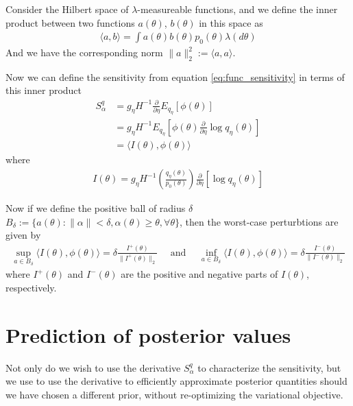 \documentclass[a4paper]{article}
\begin{document}
Consider the Hilbert space of $\lambda$-measureable functions, and we
define the inner product between two functions $a(\theta)$,
$b(\theta)$ in this space
as
\begin{align}
	\langle a, b\rangle = \int a(\theta)b(\theta) p_0(\theta) \lambda(d\theta)
\end{align}
And we have the corresponding norm $\|a\|_2^2 := \langle a, a\rangle$.

Now we can define the sensitivity from equation \ref{eq:func_sensitivity}
in terms of this inner product
\begin{align}
	S^q_\alpha &= g_\eta H^{-1}\frac{\partial}{\partial \eta} E_{q_\eta}[\phi(\theta)]\\
		&= g_\eta H^{-1}E_{q_\eta}[\phi(\theta) \frac{\partial}{\partial \eta} \log q_\eta(\theta)]\\
		&= \langle I(\theta), \phi(\theta)\rangle
\end{align}
where
\begin{align}
	 I(\theta) = g_\eta H^{-1}(\frac{q_\eta(\theta)}{p_0(\theta)})\frac{\partial}{\partial \eta} [\log q_\eta(\theta)]
\end{align}

Now if we define the positive ball of radius $\delta$
$B_\delta := \{a(\theta) : \|\alpha\| < \delta, \alpha(\theta) \geq \theta, \forall \theta\}$,
then the worst-case perturbtions are given by
\begin{align}
	\sup_{a \in B_\delta} \langle I(\theta), \phi(\theta)\rangle =
		\delta\frac{I^+(\theta)}{\|I^+(\theta)\|_2} \quad \text{ and } \quad
	\inf_{a \in B_\delta} \langle I(\theta), \phi(\theta)\rangle =
		\delta\frac{I^-(\theta)}{\|I^-(\theta)\|_2}
\end{align}
where $I^+(\theta)$ and $I^-(\theta)$ are the positive and negative parts
of $I(\theta)$, respectively.

\section{Prediction of posterior values}
Not only do we wish to use the derivative $S^q_\alpha$ to characterize the sensitivity,
but we use to use the derivative to efficiently approximate posterior quantities should we have
chosen a different prior, without re-optimizing the variational objective.
\end{document}
